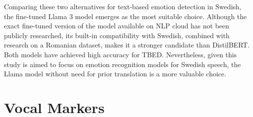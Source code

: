  Comparing these two alternatives for text-based emotion detection in Swedish, the fine-tuned Llama 3 model emerges as the most suitable choice. Although the exact fine-tuned version of the model available on NLP cloud has not been publicly researched, its built-in compatibility with Swedish, combined with research on a Romanian dataset, makes it a stronger candidate than DistilBERT. Both models have achieved high accuracy for TBED. Nevertheless, given this study is aimed to focus on emotion recognition models for Swedish speech, the Llama model without need for prior translation is a more valuable choice. 

 

\section{Vocal Markers}
\label{sec:vocal-markers}

